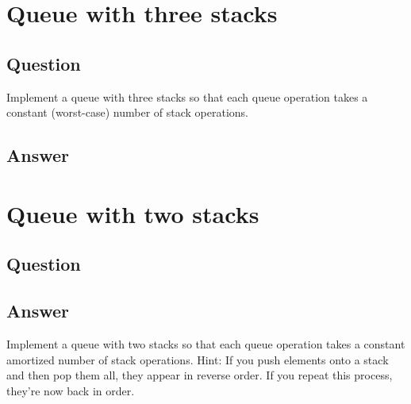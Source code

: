 \documentclass[12pt]{article}
\numberwithin{equation}{section}
\begin{document}
\newpage
\section{Queue with three stacks}
\subsection*{Question}
Implement a queue with three stacks so that each
queue operation takes a constant (worst-case) number of stack operations.
\subsection*{Answer}

\newpage
\section{Queue with two stacks}
\subsection*{Question}
\subsection*{Answer}
Implement a queue with two stacks so that each queue
operation takes a constant amortized number of stack operations. Hint: If you push
elements onto a stack and then pop them all, they appear in reverse order. If you repeat
this process, they’re now back in order.
\end{document}
